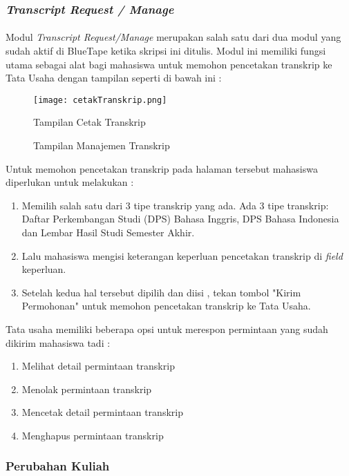 \subsubsection{\textit{Transcript Request / Manage}}
\paragraph{} Modul \textit{Transcript Request/Manage} merupakan salah satu dari dua modul yang sudah aktif di BlueTape ketika skripsi ini ditulis. Modul ini memiliki fungsi utama sebagai alat bagi mahasiswa untuk memohon pencetakan transkrip ke Tata Usaha dengan tampilan seperti di bawah ini :
\begin{figure} [H]
	\centering  
	\texttt{[image: cetakTranskrip.png]}
	\caption[Tampilan Cetak Transkrip]{Tampilan Cetak Transkrip} 
	\label{fig:flow-chart-CodeIgniter} 
\end{figure}
\begin{figure} [H]
	\centering  
	\caption[Tampilan Manajemen Transkrip]{Tampilan Manajemen Transkrip} 
	\label{fig:flow-chart-CodeIgniter} 
\end{figure}
Untuk memohon pencetakan transkrip pada halaman tersebut mahasiswa diperlukan untuk melakukan :
\begin{enumerate}
  \item Memilih salah satu dari 3 tipe transkrip yang ada. Ada 3 tipe transkrip: Daftar Perkembangan Studi (DPS) Bahasa Inggris, DPS Bahasa Indonesia dan Lembar Hasil Studi Semester Akhir.
  \item Lalu mahasiswa mengisi keterangan keperluan pencetakan transkrip di \textit{field} keperluan.
  \item Setelah kedua hal tersebut dipilih dan diisi , tekan tombol "Kirim Permohonan" untuk memohon pencetakan transkrip ke Tata Usaha.
\end{enumerate}
Tata usaha memiliki beberapa opsi untuk merespon permintaan yang sudah dikirim mahasiswa tadi :
\begin{enumerate}
	\item Melihat detail permintaan transkrip
	\item Menolak permintaan transkrip
	\item Mencetak detail permintaan transkrip
	\item Menghapus permintaan transkrip
\end{enumerate}

\subsubsection{Perubahan Kuliah}

